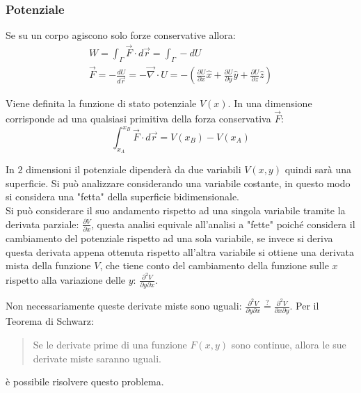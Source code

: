 \documentclass{article}
\numberwithin{equation}{subsection}
\begin{document}
\subsubsection{Potenziale}


Se su un corpo agiscono solo forze conservative allora:
\begin{gather*}
    W=\int_{\Gamma}\vec{F}\cdot d\vec{r}=\int_{\Gamma}-dU\\
    \vec{F}=-\displaystyle\frac{dU}{d\vec{r}}=-\vec{\nabla}\cdot U=-\left(\displaystyle\frac{\partial U}{\partial x}\hat{x}+\frac{\partial U}{\partial y}\hat{y}+\frac{\partial U}{\partial z}\hat{z}\right)
\end{gather*} 


Viene definita la funzione di stato potenziale $V(x)$. In una dimensione corrisponde ad una qualsiasi primitiva della forza conservativa $\vec{F}$:
\begin{equation*}
    \displaystyle\int_{x_A}^{x_B}\vec{F}\cdot d\vec{r}=V(x_B)-V(x_A)
\end{equation*}



In $2$ dimensioni il potenziale dipenderà da due variabili $V(x,y)$ 
quindi sarà una superficie. Si può analizzare considerando una 
variabile costante, in questo modo si 
considera una "fetta" della superficie bidimensionale.
\\
Si può considerare il suo andamento rispetto ad una singola 
variabile tramite la derivata parziale: $\displaystyle\frac{\partial V}{\partial x}$, 
questa analisi equivale all'analisi a "fette" poiché 
considera il cambiamento del potenziale rispetto ad una sola variabile, se invece si deriva questa derivata 
appena ottenuta rispetto all'altra variabile si ottiene una derivata 
mista della funzione $V$, che tiene conto del cambiamento della 
funzione sulle $x$ rispetto alla variazione delle $y$: $\displaystyle\frac{\partial^{2} V}{\partial y\partial x}$. 


Non necessariamente queste derivate miste sono uguali: 
$\displaystyle\frac{\partial^{2} V}{\partial y\partial x}\stackrel{?}{=}\displaystyle\frac{\partial^{2} V}{\partial x\partial y}$.
Per il Teorema di Schwarz:
\begin{quotation}
    Se le derivate prime di una funzione $F(x,y)$ sono continue, 
    allora le sue derivate miste saranno uguali.
\end{quotation}
è possibile risolvere questo problema. 
\end{document}
